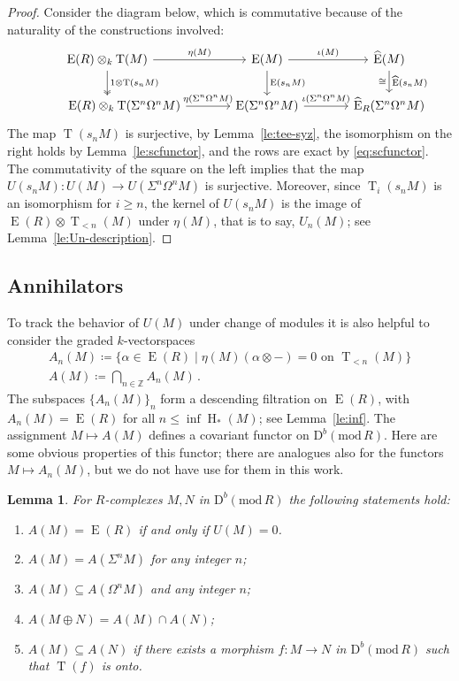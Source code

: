 \documentclass{amsart}
\numberwithin{equation}{section}
\theoremstyle{plain}
\newtheorem{lemma}[equation]{Lemma}
\theoremstyle{definition}
\theoremstyle{remark}
\newcommand{\dbcat}[1]{\mathrm{D}^b(\mathrm{mod}\,{#1})}
\newcommand{\bbZ}{\mathbb{Z}}
\newcommand{\eee}{\operatorname{E}}
\newcommand{\hh}{\operatorname{H}}
\newcommand{\tee}{\operatorname{T}}
\begin{document}
\begin{proof}
Consider the diagram below, which is commutative because of the naturality of the constructions involved:
    \[
\begin{tikzcd}[column sep=large]
    \eee(R) \otimes_k \tee(M) 
        \arrow[d, twoheadrightarrow, "1\otimes \tee(s_nM)"] \arrow[r,"\eta(M)"] 
                & \eee(M)  \arrow[r,"\iota(M)"] \arrow[d,"\eee(s_nM)" ] & \widehat{\eee}(M) \arrow[d,"\widehat{\eee}(s_nM)", "\cong" swap]\\
   \phantom{testin}\eee(R) \otimes_k  \tee(\Sigma^n\Omega^nM) \arrow[r,"\eta(\Sigma^n\Omega^nM)"]  
                & \arrow[r,"\iota(\Sigma^n\Omega^n M)"]  \eee(\Sigma^n\Omega^nM)     & \widehat{\eee}_R(\Sigma^n\Omega^nM)
\end{tikzcd}
\]
The map $\tee(s_nM)$ is surjective, by Lemma~\ref{le:tee-syz},  the isomorphism on the right holds by Lemma~\ref{le:scfunctor}, and the rows are exact by \eqref{eq:scfunctor}. The commutativity of the square on the left implies that the map $U(s_nM)\colon U(M)\to U(\Sigma^n\Omega^nM)$ is surjective. Moreover, since $\tee_i(s_nM)$ is an isomorphism for $i\ge n$, the kernel of $U(s_nM)$ is the image of $\eee(R)\otimes \tee_{<n}(M)$ under $\eta(M)$, that is to say, $U_n(M)$; see Lemma~\ref{le:Un-description}.
\end{proof}

\subsection*{Annihilators}
To track the behavior of $U(M)$ under change of modules it is also helpful to consider the graded $k$-vectorspaces
\begin{gather*}
    A_n(M)\coloneqq \{\alpha\in \eee(R)\mid  \eta(M)(\alpha\otimes-) = 0 \text{ on } \tee_{<n}(M)\} \\
    A(M) \coloneqq \bigcap_{n\in\bbZ} A_n(M)\,.
\end{gather*}
The subspaces $\{A_n(M)\}_n$ form a descending filtration on  $\eee(R)$, with $A_n(M)=\eee(R)$ for all $n\le \inf \hh_*(M)$;
see Lemma~\ref{le:inf}. The assignment $M\mapsto A(M)$ defines a covariant functor on $\dbcat R$. Here are some obvious properties of this functor; there are analogues also for the functors $M\mapsto A_n(M)$, but we do not have use for them in this work.

\begin{lemma}
\label{le:A-basics}
For $R$-complexes $M,N$ in $\dbcat R$ the following statements hold:
\begin{enumerate}[\quad\rm(1)]
    \item
    $A(M)=\eee(R)$ if and only if $U(M)=0$. 
    \item 
    $A(M)=A(\Sigma^nM)$  for any integer $n$; 
    \item
    $A(M)\subseteq A(\Omega^nM)$  and any integer $n$;
    \item
    $A(M\oplus N)=A(M)\cap A(N)$; 
    \item 
     $A(M)\subseteq A(N)$ if there exists a morphism $f\colon M\to N$ in $\dbcat R$ such that $\tee(f)$ is onto.
\end{enumerate}     
\end{lemma}
\end{document}
